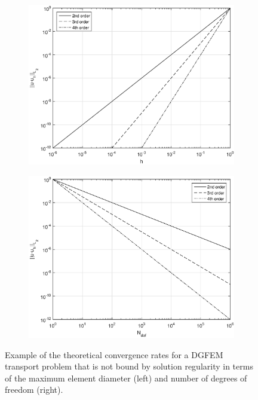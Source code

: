 \begin{figure}
\centering
	\begin{subfigure}[b]{0.495\textwidth}
		\centering
		\includegraphics[width=\textwidth]{figures/sec_Sn/hconv_larger.eps}
	\end{subfigure}
	\begin{subfigure}[b]{0.495\textwidth}
		\centering
		\includegraphics[width=\textwidth]{figures/sec_Sn/Nconv_larger.eps}
	\end{subfigure}
\caption[$L_2$ transport convergence rates]{Example of the theoretical convergence rates for a DGFEM transport problem that is not bound by solution regularity in terms of the maximum element diameter (left) and number of degrees of freedom (right).}
\label{fig::Sn_Spatial_Convergence}
\end{figure}
